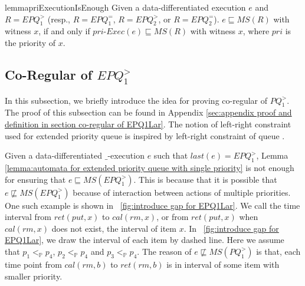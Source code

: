 \begin{restatable}{lemma}{priExecutionIsEnough}
\label{lemma:pri execution is enough}
Given a data-differentiated execution $e$ and $R = \textit{EPQ}_1^{>}$ (resp., $R = \textit{EPQ}_1^{=}$, $R=\textit{EPQ}_2^{>}$, or $R = \textit{EPQ}_2^{=}$). $e \sqsubseteq \textit{MS}(R)$ with witness $x$, if and only if $\textit{pri-Exec}(e) \sqsubseteq \textit{MS}(R)$ with witness $x$, where $\textit{pri}$ is the priority of $x$. %
\end{restatable}



\subsection{Co-Regular of $\textit{EPQ}_1^{>}$}
\label{subsec:co-regular of EPQ1Lar}

In this subsection, we briefly introduce the idea for proving co-regular of $\textit{PQ}_1^{>}$. The proof of this subsection can be found in Appendix \ref{sec:appendix proof and definition in section co-regular of EPQ1Lar}. The notion of left-right constraint used for extended priority queue is inspired by left-right constraint of queue \cite{Bouajjani:2015}.

Given a data-differentiated $\_$-execution $e$ such that $\textit{last}(e) = \textit{EPQ}_1^{>}$, Lemma \ref{lemma:automata for extended priority queue with single priority} is not enough for ensuring that $e \sqsubseteq \textit{MS}(\textit{EPQ}_1^{>})$. This is because that it is possible that $e \not\sqsubseteq \textit{MS}(\textit{EPQ}_1^{>})$ because of interaction between actions of multiple priorities. One such example is shown in \figurename~\ref{fig:introduce gap for EPQ1Lar}. We call the time interval from $\textit{ret}(\textit{put},x)$ to $\textit{cal}(rm,x)$, or from $\textit{ret}(\textit{put},x)$ when $\textit{cal}(rm,x)$ does not exist, the interval of item $x$. In \figurename~\ref{fig:introduce gap for EPQ1Lar}, we draw the interval of each item by dashed line. Here we assume that $p_1 <_{\mathbb{P}} p_4$, $p_2 <_{\mathbb{P}} p_4$ and $p_3 <_{\mathbb{P}} p_4$. The reason of $e \not\sqsubseteq \textit{MS}(\textit{PQ}_1^{>})$ is that, each time point from $\textit{cal}(\textit{rm},b)$ to $\textit{ret}(\textit{rm},b)$ is in interval of some item with smaller priority.

